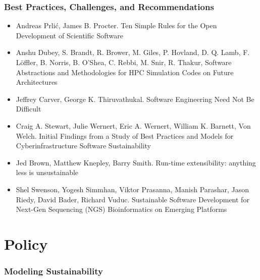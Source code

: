 \documentclass[11pt, oneside]{amsart}
\begin{document}
\subsubsection*{Best Practices, Challenges, and Recommendations}

\begin{itemize}

\item Andreas Prli\'{c}, James B. Procter. Ten Simple Rules for the
  Open Development of Scientific Software~\cite{Prlic_WSSSPE}

\item Anshu Dubey, S. Brandt, R. Brower, M. Giles, P. Hovland,
  D. Q. Lamb, F. Löffler, B. Norris, B. O'Shea, C. Rebbi, M. Snir,
  R. Thakur, Software Abstractions and Methodologies for HPC
  Simulation Codes on Future Architectures~\cite{Dubey2_WSSSPE}

\item Jeffrey Carver, George K. Thiruvathukal. Software Engineering
  Need Not Be Difficult~\cite{Carver_WSSSPE}

\item Craig A. Stewart, Julie Wernert, Eric A. Wernert, William
  K. Barnett, Von Welch. Initial Findings from a Study of Best
  Practices and Models for Cyberinfrastructure Software Sustainability~\cite{Stewart_WSSSPE}

\item Jed Brown, Matthew Knepley, Barry Smith. Run-time extensibility:
  anything less is unsustainable~\cite{Brown_WSSSPE}

\item Shel Swenson, Yogesh Simmhan, Viktor Prasanna, Manish Parashar,
  Jason Riedy, David Bader, Richard Vuduc. Sustainable Software
  Development for Next-Gen Sequencing (NGS) Bioinformatics on Emerging
  Platforms~\cite{Swenson_WSSSPE}

\end{itemize}

\section*{Policy}

\subsubsection*{Modeling Sustainability}
\end{document}
